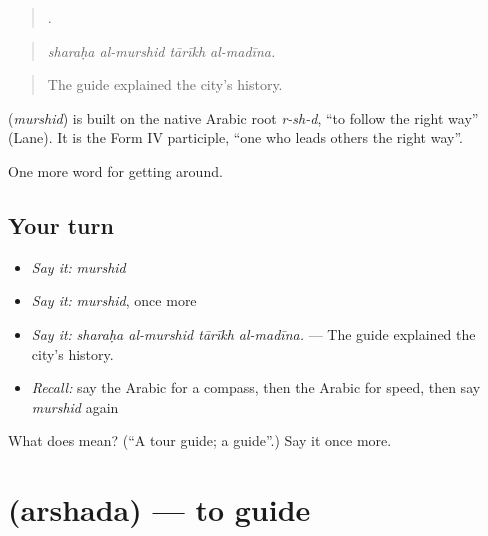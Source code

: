 \begin{quote}
   .
\end{quote}

\begin{quote}
\emph{sharaḥa al-murshid tārīkh al-madīna.}
\end{quote}

\begin{quote}
The guide explained the city's history.
\end{quote}

\begin{cousinweb}
\textbf{} (\emph{murshid}) is built on the native Arabic root \emph{r-sh-d}, \textquotedblleft{}to follow the right way\textquotedblright{} (Lane). It is the Form IV participle, \textquotedblleft{}one who leads others the right way\textquotedblright{}.
\end{cousinweb}

\begin{grammarlens}[title={What you've built}]
One more word for getting around.
\end{grammarlens}

\subsection*{Your turn}
\begin{itemize}
\raggedright
  \item \emph{Say it:} \emph{murshid}
  \item \emph{Say it:} \emph{murshid}, once more
  \item \emph{Say it:} \emph{sharaḥa al-murshid tārīkh al-madīna.} — The guide explained the city's history.
  \item \emph{Recall:} say the Arabic for a compass, then the Arabic for speed, then say \emph{murshid} again
\end{itemize}

\begin{tcolorbox}[breakable,colback=teal!4,colframe=teal!35!black,title={Before you move on}]
What does  mean? (\textquotedblleft{}A tour guide; a guide\textquotedblright{}.) Say it once more.
\end{tcolorbox}
\section[\texorpdfstring{\ar{أرشد} (arshada)}{أرشد (arshada)}]{ (arshada) — to guide}

